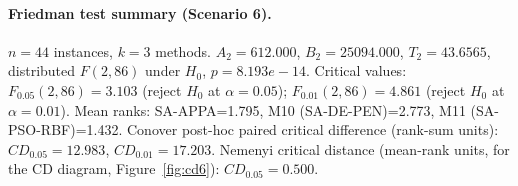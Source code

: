\endgroup

\paragraph{Friedman test summary (Scenario 6).}
$n=44$ instances, $k=3$ methods. $A_2=612.000$, $B_2=25094.000$, $T_2=43.6565$, distributed $F(2,86)$ under $H_0$, $p=8.193e-14$. Critical values: $F_{0.05}(2,86)=3.103$ (reject $H_0$ at $\alpha=0.05$); $F_{0.01}(2,86)=4.861$ (reject $H_0$ at $\alpha=0.01$). Mean ranks: SA-APPA=1.795, M10 (SA-DE-PEN)=2.773, M11 (SA-PSO-RBF)=1.432. Conover post-hoc paired critical difference (rank-sum units): $CD_{0.05}=12.983$, $CD_{0.01}=17.203$. Nemenyi critical distance (mean-rank units, for the CD diagram, Figure~\ref{fig:cd6}): $CD_{0.05}=0.500$.

